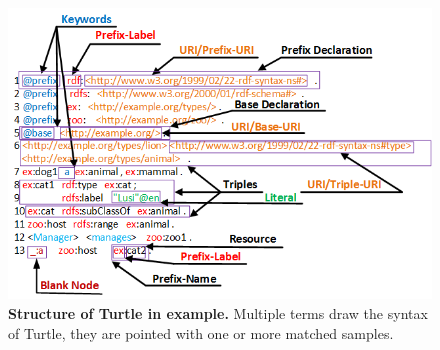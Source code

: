 \begin{figure}[ht]
	\begin{center}
		\includegraphics[scale=0.8,angle=0]{images/TurtleStructure.png}
		\setlength\belowcaptionskip{-5mm}
		\caption{\textbf{ Structure of Turtle in example.} Multiple terms draw the syntax of Turtle, they are pointed with one or more matched samples.}
		\label{Fig:TurtleStructure}
	\end{center}
\end{figure}
